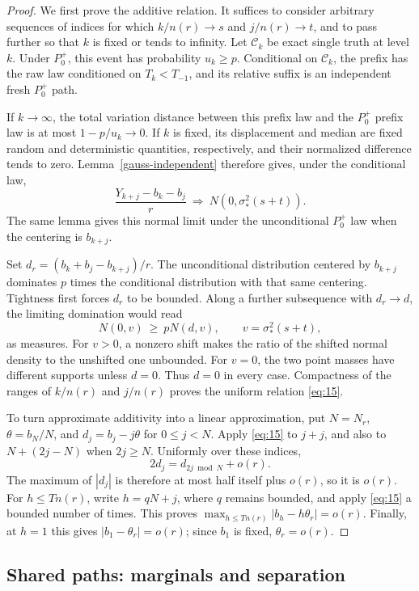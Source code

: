 \begin{proof}
We first prove the additive relation. It suffices to consider arbitrary
sequences of indices for which
\(k/n(r)\to s\) and \(j/n(r)\to t\), and to pass further so
that \(k\) is fixed or tends to infinity. Let \(\mathcal C_k\)
be exact single truth at level \(k\). Under \(P_0^+\), this event
has probability \(u_k\ge p\). Conditional on \(\mathcal C_k\),
the prefix has the raw law conditioned on \(T_k<T_{-1}\), and its
relative suffix is an independent fresh \(P_0^+\) path.

If \(k\to\infty\), the total variation distance between this
prefix law and the \(P_0^+\) prefix law is at most
\(1-p/u_k\to0\). If \(k\) is fixed, its displacement and median
are fixed random and deterministic quantities, respectively, and their
normalized difference tends to zero. Lemma~\ref{gauss-independent}
therefore gives, under the conditional law,
\[
 \frac{Y_{k+j}-b_k-b_j}{r}
 \ \Longrightarrow\ N(0,\sigma_*^2(s+t)).
\]
The same lemma gives this normal limit under the unconditional
\(P_0^+\) law when the centering is \(b_{k+j}\).

Set \(d_r=(b_k+b_j-b_{k+j})/r\). The unconditional distribution
centered by \(b_{k+j}\) dominates \(p\) times the conditional
distribution with that same centering. Tightness first forces \(d_r\)
to be bounded. Along a further subsequence with \(d_r\to d\), the
limiting domination would read
\[
 N(0,v)\ \ge\ pN(d,v),\qquad v=\sigma_*^2(s+t),
\]
as measures. For \(v>0\), a nonzero shift makes the ratio of the
shifted normal density to the unshifted one unbounded. For \(v=0\),
the two point masses have different supports unless \(d=0\).
Thus \(d=0\) in every case. Compactness of the ranges of
\(k/n(r)\) and \(j/n(r)\) proves the uniform relation
\eqref{eq:15}.

To turn approximate additivity into a linear approximation, put
\(N=N_r\), \(\theta=b_N/N\), and
\(d_j=b_j-j\theta\) for \(0\le j<N\). Apply \eqref{eq:15}
to \(j+j\), and also to \(N+(2j-N)\) when \(2j\ge N\).
Uniformly over these indices,
\[
 2d_j=d_{2j\bmod N}+o(r).
\]
The maximum of \(|d_j|\) is therefore at most half itself plus
\(o(r)\), so it is \(o(r)\). For \(h\le Tn(r)\), write
\(h=qN+j\), where \(q\) remains bounded, and apply
\eqref{eq:15} a bounded number of times. This proves
\(\max_{h\le Tn(r)}|b_h-h\theta_r|=o(r)\). Finally, at \(h=1\)
this gives \(|b_1-\theta_r|=o(r)\); since \(b_1\) is fixed,
\(\theta_r=o(r)\).
\end{proof}

\subsection{Shared paths: marginals and separation}

